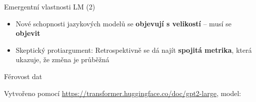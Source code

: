 \documentclass[aspectratio=169,dvipsnames]{beamer}
\begin{document}

\begin{frame}{Emergentní vlastnosti LM (2)}

    \begin{itemize}[<+->]

		\item Nové schopnosti jazykových modelů se \textbf{objevují s
				velikostí} -- musí se \textbf{objevit}

		\item Skeptický protiargument: Retrospektivně se dá najít
				\textbf{spojitá metrika}, která ukazuje, že změna je průběžná
					\citep{schaeffer2023emergent}

    \end{itemize}

\end{frame}


\begin{frame}{Férovost dat}

    \begin{center}


    \end{center}

    \centering


    {\tiny Vytvořeno pomocí \url{https://transformer.huggingface.co/doc/gpt2-large}, model: \citet{radford2019language}}


\end{frame}

\end{document}
